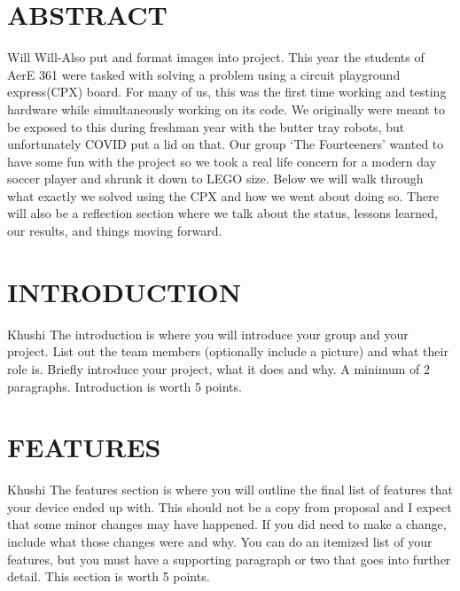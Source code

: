\documentclass[12pt]{article}
\begin{document}
\tableofcontents
\pagebreak

\section{ABSTRACT}
Will
Will-Also put and format images into project.
This year the students of AerE 361 were tasked with solving a problem using a circuit playground express(CPX) board.
For many of us, this was the first time working and testing hardware while simultaneously working on its code. We originally
were meant to be exposed to this during freshman year with the butter tray robots, but unfortunately COVID put a lid on that.
Our group `The Fourteeners' wanted to have some fun with the project so we took a real life concern for a modern day soccer player
and shrunk it down to LEGO size. Below we will walk through what exactly we solved using the CPX and how we went about doing so.
There will also be a reflection section where we talk about the status, lessons learned, our results, and things moving forward.
\section{INTRODUCTION}
Khushi
The introduction is where you will introduce your group and your project. List out the team members (optionally include a picture) and what their role is. Briefly introduce your project, what it does and why. A minimum of 2 paragraphs. Introduction is worth 5 points.

\section{FEATURES}
Khushi
The features section is where you will outline the final list of features that your device ended up with. This should not be a copy from proposal and I expect that some minor changes may have happened. If you did need to make a change, include what those changes were and why. You can do an itemized list of your features, but you must have a supporting paragraph or two that goes into further detail. This section is worth 5 points.
\end{document}
